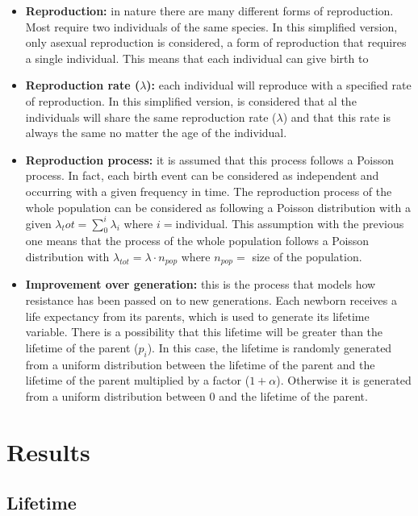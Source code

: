 \documentclass[conference]{IEEEtran}
\begin{document}
    \begin{itemize}
        \item \textbf{Reproduction:} in nature there are many different forms of reproduction. Most require two individuals of the same species.
        In this simplified version, only asexual reproduction is considered, a form of reproduction that requires a single individual.
        This means that each individual can give birth to
        \item \textbf{Reproduction rate ($\lambda$):} each individual will reproduce with a specified rate of reproduction. In this simplified version, is considered that al the individuals will share the same reproduction rate ($\lambda$) and that this rate is always the same no matter the age of the individual.
        \item \textbf{Reproduction process:} it is assumed that this process follows a Poisson process. In fact, each birth event can be considered as independent and occurring with a given frequency in time. The reproduction process of the whole population can be considered as following a Poisson distribution with a given $\lambda_tot = \sum_{0}^{i}\lambda_i$ where $i=$individual. This assumption with the previous one means that the process of the whole population follows a Poisson distribution with $\lambda_{tot} = \lambda \cdot {n}_{pop}$ where ${n}_{pop}=$ size of the population. 
        \item \textbf{Improvement over generation:} this is the process that models how resistance has been passed on to new generations. Each newborn receives a life expectancy from its parents, which is used to generate its lifetime variable. There is a possibility that this lifetime will be greater than the lifetime of the parent ($p_i$). In this case, the lifetime is randomly generated from a uniform distribution between the lifetime of the parent and the lifetime of the parent multiplied by a factor ($1+\alpha$). Otherwise it is generated from a uniform distribution between 0 and the lifetime of the parent.
    \end{itemize}

\section{Results}

    \subsection{Lifetime}
\end{document}
